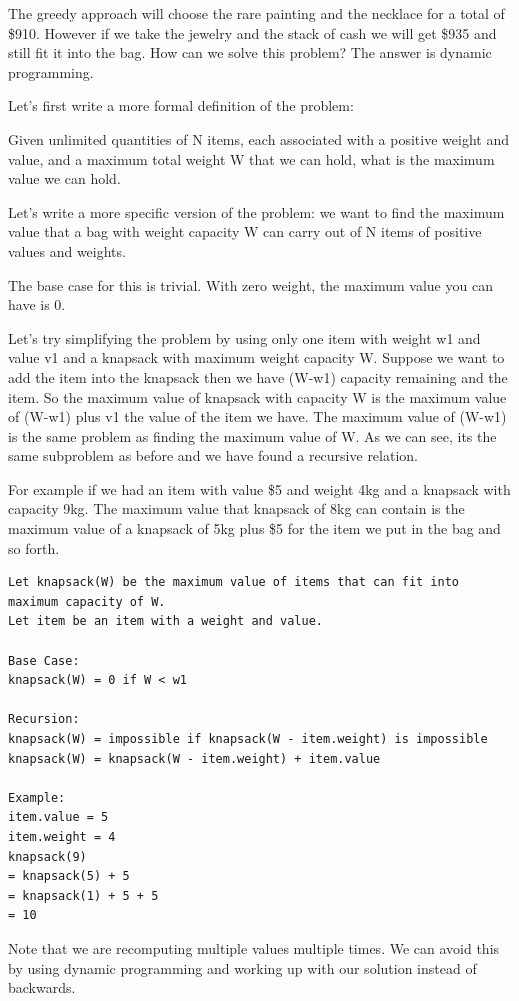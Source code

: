\documentclass[11pt,oneside]{book}
\begin{document}
The greedy approach will choose the rare painting and the necklace for a total of \$910. However if we take the jewelry and the stack of cash we will get \$935 and still fit it into the bag. How can we solve this problem? The answer is dynamic programming.

Let's first write a more formal definition of the problem:

Given unlimited quantities of N items, each associated with a positive weight and value, and a maximum total weight W that we can hold, what is the maximum value we can hold.

Let's write a more specific version of the problem: we want to find the maximum value that a bag with weight capacity W can carry out of N items of positive values and weights.

The base case for this is trivial. With zero weight, the maximum value you can have is 0.

Let's try simplifying the problem by using only one item with weight w1 and value v1 and a knapsack with maximum weight capacity W. Suppose we want to add the item into the knapsack then we have (W-w1) capacity remaining and the item. So the maximum value of knapsack with capacity W is the maximum value of (W-w1) plus v1 the value of the item we have. The maximum value of (W-w1) is the same problem as finding the maximum value of W. As we can see, its the same subproblem as before and we have found a recursive relation.

For example if we had an item with value \$5 and weight 4kg and a knapsack with capacity 9kg. The maximum value that knapsack of 8kg can contain is the maximum value of a knapsack of 5kg plus \$5 for the item we put in the bag and so forth.

\begin{lstlisting}
Let knapsack(W) be the maximum value of items that can fit into maximum capacity of W.
Let item be an item with a weight and value.

Base Case:
knapsack(W) = 0 if W < w1

Recursion:
knapsack(W) = impossible if knapsack(W - item.weight) is impossible
knapsack(W) = knapsack(W - item.weight) + item.value

Example:
item.value = 5
item.weight = 4
knapsack(9)
= knapsack(5) + 5
= knapsack(1) + 5 + 5
= 10
\end{lstlisting}

Note that we are recomputing multiple values multiple times. We can avoid this by using dynamic programming and working up with our solution instead of backwards.
\end{document}
